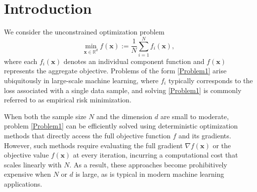 \documentclass{article}
\theoremstyle{plain}
\theoremstyle{definition}
\theoremstyle{remark}
\begin{document}
\printAffiliationsAndNotice{}  %

\begin{abstract}
We propose a stochastic trust-region method for unconstrained nonconvex optimization that incorporates stochastic variance-reduced gradients (SVRG) to accelerate convergence. Unlike classical trust-region methods, the proposed algorithm relies solely on stochastic gradient information and does not require function value evaluations. The trust-region radius is adaptively adjusted based on a radius-control parameter and the stochastic gradient estimate. Under mild assumptions, we establish that the algorithm converges in expectation to a first-order stationary point. Moreover, the method achieves iteration and sample complexity bounds that match those of SVRG-based first-order methods, while allowing stochastic and potentially gradient-dependent second-order information. Extensive numerical experiments demonstrate that incorporating SVRG accelerates convergence, and that the use of trust-region methods and Hessian information further improves performance. We also highlight the impact of batch size and inner-loop length on efficiency, and show that the proposed method outperforms SGD and Adam on several machine learning tasks.
\end{abstract}
\section{Introduction}\label{intro}

We consider the unconstrained optimization problem
\begin{equation}\label{Problem1}
\min_{\boldsymbol{x} \in \mathbb{R}^{d}} f(\boldsymbol{x}) := \frac{1}{N} \sum_{i=1}^{N} f_i(\boldsymbol{x}),
\end{equation}
where each $f_i(\boldsymbol{x})$ denotes an individual component function and $f(\boldsymbol{x})$ represents the aggregate objective. Problems of the form \eqref{Problem1} arise ubiquitously in large-scale machine learning, where $f_i$ typically corresponds to the loss associated with a single data sample, and solving \eqref{Problem1} is commonly referred to as empirical risk minimization.

When both the sample size $N$ and the dimension $d$ are small to moderate, problem \eqref{Problem1} can be efficiently solved using deterministic optimization methods that directly access the full objective function $f$ and its gradients. However, such methods require evaluating the full gradient $\nabla f(\boldsymbol{x})$ or the objective value $f(\boldsymbol{x})$ at every iteration, incurring a computational cost that scales linearly with $N$. As a result, these approaches become prohibitively expensive when $N$ or $d$ is large, as is typical in modern machine learning applications.
\end{document}
